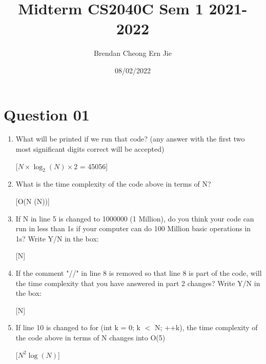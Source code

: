 \documentclass{article}
\title{Midterm CS2040C Sem 1 2021-2022}
\author{Brendan Cheong Ern Jie}
\date {08/02/2022}
\begin{document}
\maketitle

\section{Question 01}
\begin{enumerate}[label=(\arabic*)]
\item What will be printed if we run that code? (any answer with the first two most significant digits correct will be accepted)

[$N \times \log_2(N) \times 2$    = 45056]

\item What is the time complexity of the code above in terms of N?

[O(N \log(N))]

\item If N in line 5 is changed to 1000000 (1 Million), do you think your code can run in less
than 1s if your computer can do 100 Million basic operations in 1s? Write Y/N in the
box:

[N]

\item If the comment "//" in line 8 is removed so that line 8 is part of the code, will the time
complexity that you have answered in part 2 changes? Write Y/N in the box:

[N]

\item  If line 10 is changed to for (int k = 0; k $<$ N; ++k), the time complexity of the code
above in terms of N changes into O(5) 

[$N^2\log(N)$]

\end{enumerate}
\end{document}
